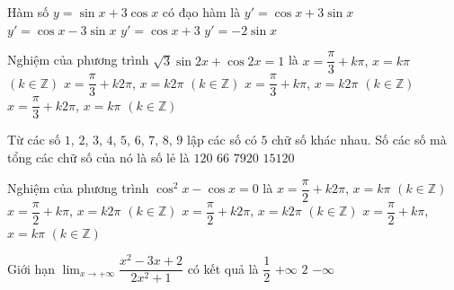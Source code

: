 \begin{ex}%
Hàm số $y=\sin x + 3\cos x$ có đạo hàm là
\choice
{$y'=\cos x + 3\sin x$}
{\True $y'=\cos x - 3\sin x$}
{$y'=\cos x + 3$}
{$y'=-2\sin x$}
\end{ex}

\begin{ex}%
Nghiệm của phương trình $\sqrt{3}\sin 2x + \cos 2x = 1$ là
\choice
{\True $x=\dfrac{\pi}{3}+k\pi$, $x=k\pi$ $(k \in \mathbb{Z})$}
{$x=\dfrac{\pi}{3}+k2\pi$, $x=k2\pi$ $(k \in \mathbb{Z})$}
{$x=\dfrac{\pi}{3}+k\pi$, $x=k2\pi$ $(k \in \mathbb{Z})$}
{$x=\dfrac{\pi}{3}+k2\pi$, $x=k\pi$ $(k \in \mathbb{Z})$}
\end{ex}

\begin{ex}%
Từ các số $1$, $2$, $3$, $4$, $5$, $6$, $7$, $8$, $9$ lập các số có $5$ chữ số khác nhau. Số các số mà tổng các chữ số của nó là số lẻ là
\choice
{$120$}
{$66$}
{\True $7920$}
{$15120$}
\end{ex}

\begin{ex}%
Nghiệm của phương trình $\cos^2 x - \cos x =0$ là
\choice
{$x=\dfrac{\pi}{2}+k2\pi$, $x=k\pi$ $(k \in \mathbb{Z})$}
{\True $x=\dfrac{\pi}{2}+k\pi$, $x=k2\pi$ $(k \in \mathbb{Z})$}
{$x=\dfrac{\pi}{2}+k2\pi$, $x=k2\pi$ $(k \in \mathbb{Z})$}
{$x=\dfrac{\pi}{2}+k\pi$, $x=k\pi$ $(k \in \mathbb{Z})$}
\end{ex}

\begin{ex}%
Giới hạn $\displaystyle\lim_{x\to +\infty}\dfrac{x^2-3x+2}{2x^2+1}$ có kết quả là
\choice
{\True $\dfrac{1}{2}$}
{$+\infty$}
{$2$}
{$-\infty$}
\end{ex}

